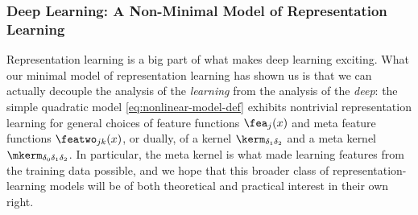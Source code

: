 \subsubsection{Deep Learning: A Non-Minimal Model of Representation Learning}





Representation learning is a big part of what makes deep learning exciting. 
What our minimal model of representation learning has shown us is that
we can actually decouple the analysis of the \emph{learning} from the analysis of the \emph{deep}:
the simple quadratic model
\eqref{eq:nonlinear-model-def} 
exhibits nontrivial representation learning for general choices of feature functions
$\fea_j(x)$
and meta feature functions
$\featwo_{jk}(x)$,
or dually, of a kernel 
$\kerm_{\delta_1\delta_2}$
and a meta kernel 
$\mkerm_{\delta_0\delta_1\delta_2}$. 
In particular, the
meta kernel is what made learning features from the training data possible, and we hope that this broader class of representation-learning models will be of both theoretical and practical interest in their own right.

